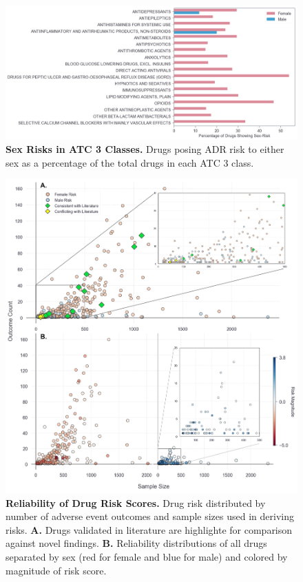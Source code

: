 \documentclass[11pt, oneside]{article}
\begin{document}
\hfill

\begin{figure}[H]
	\centering
	\includegraphics[width=\textwidth]{atc3}
	\caption{\textbf{Sex Risks in ATC 3 Classes.} Drugs posing ADR risk to either sex as a percentage of the total drugs in each ATC 3 class.}
	\label{fig:atc3}
\end{figure}

\begin{figure}[H]
	\centering
	\includegraphics[width=\textwidth]{reliability}
	\caption{\textbf{Reliability of Drug Risk Scores.} Drug risk distributed by number of adverse event outcomes and sample sizes used in deriving risks. \textbf{A.} Drugs validated in literature are highlighte for comparison against novel findings. \textbf{B.} Reliability distributions of all drugs separated by sex (red for female and blue for male) and colored by magnitude of risk score.}
	\label{fig:reliability}
\end{figure}

\newpage


{}
\end{document}
